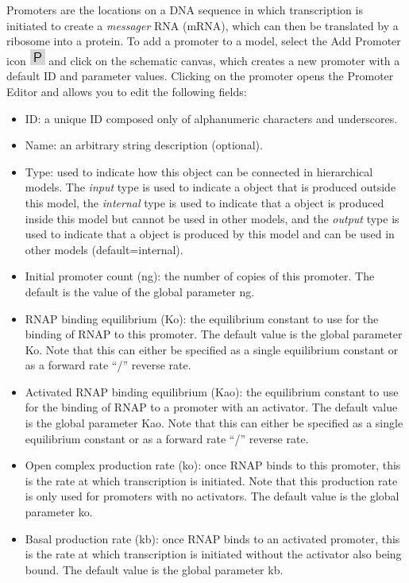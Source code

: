 \documentclass[titlepage,11pt]{article}
\begin{document}
\noindent
Promoters are the locations on a DNA sequence in which transcription is initiated to create a \emph{messager} RNA (mRNA), which can then be translated by a ribosome into a protein.  To add a promoter to a model, select the Add Promoter icon \includegraphics{../gui/icons/modelview/promoter_mode_selected} and click on the schematic canvas, which creates a new promoter with a default ID and parameter values.  Clicking on the promoter opens the Promoter Editor and allows you to edit the following fields:
\begin{itemize}
\item ID: a unique ID composed only of alphanumeric characters and underscores.
\item Name: an arbitrary string description (optional).
\item Type: used to indicate how this object can be connected in hierarchical models.  The \emph{input} type is used to indicate a object that is produced outside this model, the \emph{internal} type is used to indicate that a object is produced inside this model but cannot be used in other models, and the \emph{output} type is used to indicate that a object is produced by this model and can be used in other models (default=internal). 
\item Initial promoter count (ng): the number of copies of this promoter.  The default is the value of the global parameter ng.   
\item RNAP binding equilibrium (Ko): the equilibrium constant to use for the binding of RNAP to this promoter.  The default value is the global parameter Ko.  Note that this can either be specified as a single equilibrium constant or as a forward rate ``/'' reverse rate.
\item Activated RNAP binding equilibrium (Kao): the equilibrium constant to use for the binding of RNAP to a promoter with an activator.  The default value is the global parameter Kao.  Note that this can either be specified as a single equilibrium constant or as a forward rate ``/'' reverse rate.
\item Open complex production rate (ko): once RNAP binds to this promoter, this is the rate at which transcription is initiated.  Note that this production rate is only used for promoters with no activators.  The default value is the global parameter ko.
\item Basal production rate (kb): once RNAP binds to an activated promoter, this is the rate at which transcription is initiated without the activator also being bound.  The default value is the global parameter kb.

\end{itemize}
\end{document}
